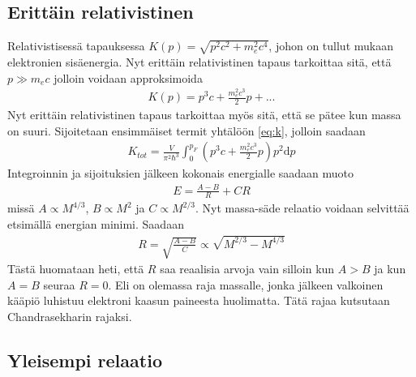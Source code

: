 \documentclass[12pt,a4paper,titlepage]{article}
\begin{document}
\subsection{Erittäin relativistinen}
Relativistisessä tapauksessa $K(p) = \sqrt{p^2 c^2 + m_e^2 c^4}$, johon on tullut mukaan elektronien sisäenergia. Nyt erittäin relativistinen tapaus tarkoittaa sitä, että $p \gg m_ec$ jolloin voidaan approksimoida
\begin{align}
K(p) = p^3 c + \frac{m_e^2 c^3}{2} p + ...
\end{align} 
Nyt erittäin relativistinen tapaus tarkoittaa myös sitä, että se pätee kun massa on suuri. Sijoitetaan ensimmäiset termit yhtälöön \eqref{eq:k}, jolloin saadaan
\begin{align}
K_{tot} = \frac{V}{\pi^2 \hbar^3} \int_0^{p_F} \left( p^3 c + \frac{m_e^2 c^3}{2} p \right) p^2 \mathrm{d}p
\end{align}
Integroinnin ja sijoituksien jälkeen kokonais energialle saadaan muoto
\begin{align}
E = \frac{A-B}{R}+C R 
\end{align}
missä $A \propto M^{4/3}$, $B \propto M^{2}$ ja $C \propto M^{2/3}$. Nyt massa-säde relaatio voidaan selvittää etsimällä energian minimi. Saadaan
\begin{align}
R = \sqrt{\frac{A-B}{C}} \propto \sqrt{M^{2/3}-M^{4/3}} \label{eq:rela}
\end{align}
Tästä huomataan heti, että $R$ saa reaalisia arvoja vain silloin kun $A > B$ ja kun $A = B$ seuraa $R = 0$. Eli on olemassa raja massalle, jonka jälkeen valkoinen kääpiö luhistuu elektroni kaasun paineesta huolimatta. Tätä rajaa kutsutaan Chandrasekharin rajaksi. 

\subsection{Yleisempi relaatio}
\end{document}
